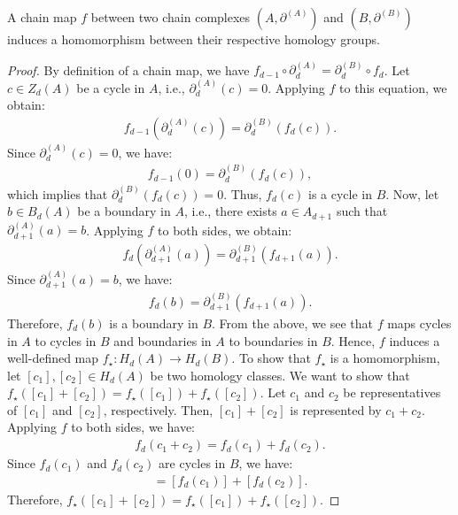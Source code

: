 \begin{theorem}{\cite[Theorem 1.3.1]{Weibel1994}}
	\label{chainmaps}
	A chain map $f$ between two chain complexes $(A, \partial^{(A)}
	)$ and $(B, \partial^{(B)})$ induces a homomorphism between their respective homology
	groups.
\end{theorem}

\begin{proof}
	By definition of a chain map, we have \( f_{d-1} \circ \partial^{(A)}_d = \partial^{(B)}_d \circ f_d \). Let \(c \in Z_{d}(A)\) be a cycle in \( A \), i.e., \( \partial^{(A)}_{d}(c) = 0 \). Applying \( f \) to this equation, we obtain:
	\begin{align}
		f_{d-1}(\partial^{(A)}_{d}(c)) = \partial^{(B)}_{d}(f_{d}(c)). 
	\end{align}
	Since \( \partial^{(A)}_{d}(c) = 0 \), we have:
	\begin{align}
		f_{d-1}(0) = \partial^{(B)}_{d}(f_{d}(c)), 
	\end{align}
	which implies that \( \partial^{(B)}_{d}(f_{d}(c)) = 0 \). Thus, \( f_{d}(c) \) is a cycle in \( B \). Now, let \(b \in B_{d}(A) \) be a boundary in \( A \), i.e., there exists \( a \in A_{d+1} \) such that \( \partial^{(A)}_{d+1}(a) = b \). Applying \( f \) to both sides, we obtain:
	\begin{align}
		f_{d}(\partial^{(A)}_{d+1}(a)) = \partial^{(B)}_{d+1}(f_{d+1}(a)). 
	\end{align}
	Since \( \partial^{(A)}_{d+1}(a) = b \), we have:
	\begin{align}
		f_{d}(b) = \partial^{(B)}_{d+1}(f_{d+1}(a)). 
	\end{align}
	Therefore, \( f_{d}(b) \) is a boundary in \( B \). From the above, we see that \( f \) maps cycles in \( A \) to cycles in \( B \) and boundaries in \( A \) to boundaries in \( B \). Hence, \( f \) induces a well-defined map \( f_{\star}: H_{d}(A) \rightarrow H_{d}(B) \). To show that \( f_{\star} \) is a homomorphism, let \([c_{1}], [c_{2}] \in H_{d}(A) \) be two homology classes. We want to show that \( f_{\star}([c_{1}] + [c_{2}]) = f_{\star}([c_{1}]) + f_{\star}([c_{2}]) \). Let \( c_{1} \) and \( c_{2} \) be representatives of \([c_{1}]\) and \([c_{2}]\), respectively. Then, \([c_{1}] + [c_{2}]\) is represented by \( c_{1} + c_{2} \). Applying \( f \) to both sides, we have:
	\begin{align}
		f_{d}(c_{1} + c_{2}) = f_{d}(c_{1}) + f_{d}(c_{2}). 
	\end{align}
	Since \( f_{d}(c_{1}) \) and \( f_{d}(c_{2}) \) are cycles in \( B \), we have:
	\begin{align}
		[f_{d}(c_{1} + c_{2})] = [f_{d}(c_{1})] + [f_{d}(c_{2})]. 
	\end{align}
	Therefore, \( f_{\star}([c_{1}] + [c_{2}]) = f_{\star}([c_{1}]) + f_{\star}([c_{2}]) \).
\end{proof}

